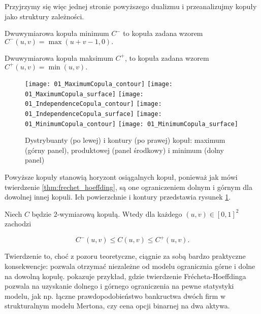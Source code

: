 Przyjrzymy się więc jednej stronie powyższego dualizmu i przeanalizujmy kopuły jako struktury zależności.

\begin{df}
	Dwuwymiarowa kopuła minimum $C^{-}$ to kopuła zadana wzorem $C^{-}(u, v) = \max(u+v-1, 0).$
\end{df}
\begin{df}
	Dwuwymiarowa kopuła maksimum $C^{+}$, to kopuła zadana wzorem $C^{+}(u, v) = \min(u, v).$
\end{df}

\begin{figure}[h]
	\centering
	\texttt{[image: 01\_MaximumCopula\_contour]}
	\texttt{[image: 01\_MaximumCopula\_surface]}
	\texttt{[image: 01\_IndependenceCopula\_contour]}
	\texttt{[image: 01\_IndependenceCopula\_surface]}
	\texttt{[image: 01\_MinimumCopula\_contour]}
	\texttt{[image: 01\_MinimumCopula\_surface]}
	
	\caption{Dystrybuanty (po lewej) i kontury (po prawej) kopuł: maximum (górny panel), produktowej (panel środkowy) i minimum (dolny panel)\label{fig:minmaxprod_copula}}
\end{figure}

Powyższe kopuły stanowią horyzont osiągalnych kopuł, ponieważ jak mówi twierdzenie \ref{thm:frechet_hoeffding}, są one ograniczeniem dolnym i górnym dla dowolnej innej kopuli. Ich powierzchnie i kontury przedstawia rysunek \ref{fig:minmaxprod_copula}. 

\begin{thm}
	Niech $C$ będzie $2$-wymiarową kopułą. Wtedy dla każdego $(u, v)\in[0, 1]^2$ zachodzi
	
	$$ C^{-}(u, v) \leqslant C(u, v) \leqslant C^{+}(u, v).$$
	
	\label{thm:frechet_hoeffding}
\end{thm}

Twierdzenie to, choć z pozoru teoretyczne, ciągnie za sobą bardzo praktyczne konsekwencje: pozwala otrzymać niezależne od modelu ogranicznia górne i dolne na dowolną kopułę. \cite{Cherubini_Copula_Methods_in_Finance} pokazuje przykład, gdzie twierdzenie Frécheta-Hoeffdinga pozwala na uzyskanie dolnego i górnego ograniczenia na pewne statystyki modelu, jak np. łączne prawdopodobieństwo bankructwa dwóch firm w strukturalnym modelu Mertona, czy cena opcji binarnej na dwa aktywa.

